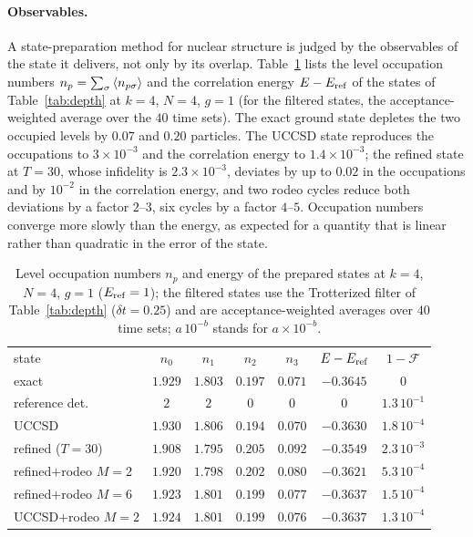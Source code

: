\documentclass[
  aps,            %
  prc,            %
  reprint,        %
  superscriptaddress,
  floatfix,
  nofootinbib
]{revtex4-2}
\begin{document}
\paragraph{Observables.}
A state-preparation method for nuclear structure is judged by the observables
of the state it delivers, not only by its overlap.  Table~\ref{tab:obs} lists
the level occupation numbers $n_p=\sum_\sigma\expval{n_{p\sigma}}$ and the
correlation energy $E-E_{\rm ref}$ of the states of Table~\ref{tab:depth} at
$k=4$, $N=4$, $g=1$ (for the filtered states, the acceptance-weighted average
over the $40$ time sets).  The exact ground state depletes the two occupied
levels by $0.07$ and $0.20$ particles.  The UCCSD state reproduces the
occupations to $3\times10^{-3}$ and the correlation energy to $1.4\times10^{-3}$;
the refined state at $T=30$, whose infidelity is $2.3\times10^{-3}$, deviates by
up to $0.02$ in the occupations and by $10^{-2}$ in the correlation energy,
and two rodeo cycles reduce both deviations by a factor $2$--$3$, six cycles by
a factor $4$--$5$.  Occupation numbers converge more slowly than the energy,
as expected for a quantity that is linear rather than quadratic in the error
of the state.

\begin{table}[t]
\caption{\label{tab:obs}Level occupation numbers $n_p$ and energy of the
prepared states at $k=4$, $N=4$, $g=1$ ($E_{\rm ref}=1$); the filtered states
use the Trotterized filter of Table~\ref{tab:depth} ($\delta t=0.25$) and are
acceptance-weighted averages over $40$ time sets; $a\,10^{-b}$ stands for
$a\times10^{-b}$.}
\footnotesize
\begin{ruledtabular}
\begin{tabular}{lcccccc}
state & $n_0$ & $n_1$ & $n_2$ & $n_3$ & $E-E_{\rm ref}$ & $1-\mathcal F$\\
\colrule
exact & $1.929$ & $1.803$ & $0.197$ & $0.071$ & $-0.3645$ & $0$\\
reference det. & $2$ & $2$ & $0$ & $0$ & $0$ & $1.3\,10^{-1}$\\
UCCSD & $1.930$ & $1.806$ & $0.194$ & $0.070$ & $-0.3630$ & $1.8\,10^{-4}$\\
refined ($T{=}30$) & $1.908$ & $1.795$ & $0.205$ & $0.092$ & $-0.3549$ & $2.3\,10^{-3}$\\
refined$+$rodeo $M{=}2$ & $1.920$ & $1.798$ & $0.202$ & $0.080$ & $-0.3621$ & $5.3\,10^{-4}$\\
refined$+$rodeo $M{=}6$ & $1.923$ & $1.801$ & $0.199$ & $0.077$ & $-0.3637$ & $1.5\,10^{-4}$\\
UCCSD$+$rodeo $M{=}2$ & $1.924$ & $1.801$ & $0.199$ & $0.076$ & $-0.3637$ & $1.3\,10^{-4}$\\
\end{tabular}
\end{ruledtabular}
\end{table}
\end{document}
